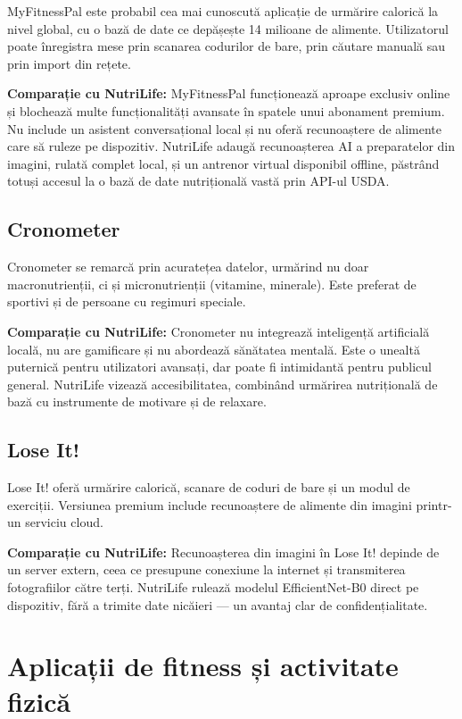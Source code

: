 \documentclass[12pt, a4paper, twoside]{report}
\numberwithin{equation}{section}
\begin{document}
MyFitnessPal este probabil cea mai cunoscută aplicație de urmărire calorică la nivel global,
cu o bază de date ce depășește 14 milioane de alimente. Utilizatorul poate înregistra mese
prin scanarea codurilor de bare, prin căutare manuală sau prin import din rețete.

\textbf{Comparație cu NutriLife:} MyFitnessPal funcționează aproape exclusiv online și
blochează multe funcționalități avansate în spatele unui abonament premium. Nu include un
asistent conversațional local și nu oferă recunoaștere de alimente care să ruleze pe
dispozitiv. NutriLife adaugă recunoașterea AI a preparatelor din imagini, rulată complet
local, și un antrenor virtual disponibil offline, păstrând totuși accesul la o bază de date
nutrițională vastă prin API-ul USDA.

\subsection{Cronometer}

Cronometer se remarcă prin acuratețea datelor, urmărind nu doar macronutrienții, ci și
micronutrienții (vitamine, minerale). Este preferat de sportivi și de persoane cu regimuri
speciale.

\textbf{Comparație cu NutriLife:} Cronometer nu integrează inteligență artificială locală,
nu are gamificare și nu abordează sănătatea mentală. Este o unealtă puternică pentru
utilizatori avansați, dar poate fi intimidantă pentru publicul general. NutriLife vizează
accesibilitatea, combinând urmărirea nutrițională de bază cu instrumente de motivare și de
relaxare.

\subsection{Lose It!}

Lose It! oferă urmărire calorică, scanare de coduri de bare și un modul de exerciții.
Versiunea premium include recunoaștere de alimente din imagini printr-un serviciu cloud.

\textbf{Comparație cu NutriLife:} Recunoașterea din imagini în Lose It! depinde de un server
extern, ceea ce presupune conexiune la internet și transmiterea fotografiilor către terți.
NutriLife rulează modelul EfficientNet-B0 direct pe dispozitiv, fără a trimite date nicăieri
--- un avantaj clar de confidențialitate.

\section{Aplicații de fitness și activitate fizică}
\end{document}
